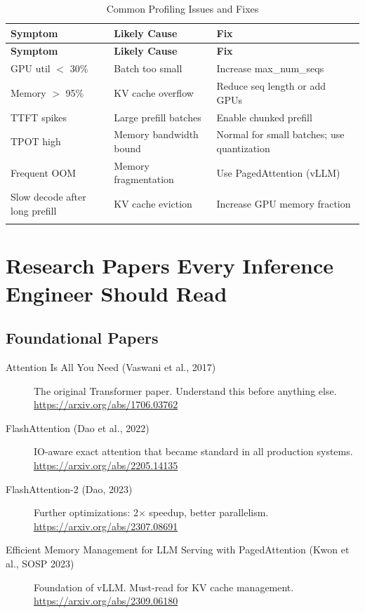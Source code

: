 \documentclass[11pt, twoside, openright]{book}
\begin{document}
\begin{longtable}{@{}p{4cm}p{4cm}p{5cm}@{}}
  \toprule
  \textbf{Symptom} & \textbf{Likely Cause} & \textbf{Fix} \\
  \midrule
  \endfirsthead
  \toprule
  \textbf{Symptom} & \textbf{Likely Cause} & \textbf{Fix} \\
  \midrule
  \endhead
  GPU util $<$ 30\% & Batch too small & Increase max\_num\_seqs \\
  Memory $>$ 95\% & KV cache overflow & Reduce seq length or add GPUs \\
  TTFT spikes & Large prefill batches & Enable chunked prefill \\
  TPOT high & Memory bandwidth bound & Normal for small batches; use quantization \\
  Frequent OOM & Memory fragmentation & Use PagedAttention (vLLM) \\
  Slow decode after long prefill & KV cache eviction & Increase GPU memory fraction \\
  \bottomrule
  \caption{Common Profiling Issues and Fixes}
\end{longtable}

\chapter{Research Papers Every Inference Engineer Should Read}
\label{app:papers}

\section*{Foundational Papers}

\begin{description}
  \item[Attention Is All You Need (Vaswani et al., 2017)]
    The original Transformer paper.  Understand this before anything else.
    \url{https://arxiv.org/abs/1706.03762}

  \item[FlashAttention (Dao et al., 2022)]
    IO-aware exact attention that became standard in all production systems.
    \url{https://arxiv.org/abs/2205.14135}

  \item[FlashAttention-2 (Dao, 2023)]
    Further optimizations: 2$\times$ speedup, better parallelism.
    \url{https://arxiv.org/abs/2307.08691}

  \item[Efficient Memory Management for LLM Serving with PagedAttention
    (Kwon et al., SOSP 2023)]
    Foundation of vLLM.  Must-read for KV cache management.
    \url{https://arxiv.org/abs/2309.06180}
\end{description}
\end{document}

